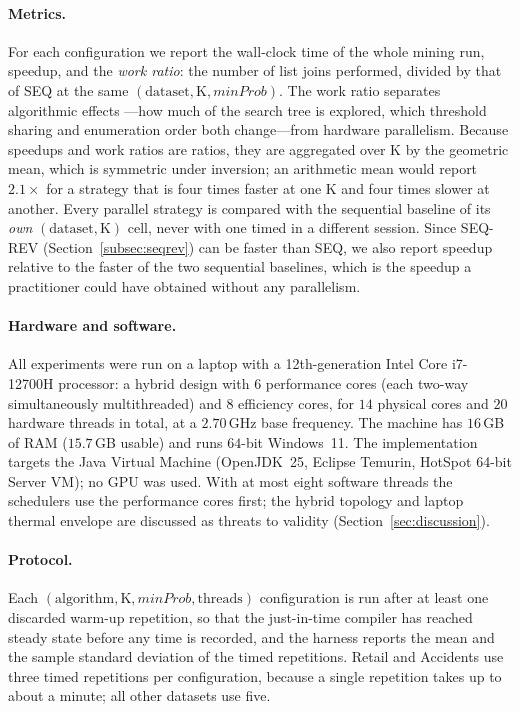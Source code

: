 \documentclass[pdflatex,sn-vancouver-num]{sn-jnl}
\theoremstyle{thmstyleone}%
\theoremstyle{thmstyletwo}%
\theoremstyle{thmstylethree}%
\newcommand{\minprob}{\mathit{minProb}}
\newcommand{\Kk}{\mathrm{K}}
\begin{document}
\paragraph{Metrics.}
For each configuration we report the wall-clock time of the whole mining
run, speedup, and the \emph{work ratio}: the number of
list joins performed, divided by that of SEQ at the same
$(\text{dataset},\Kk,\minprob)$. The work ratio separates algorithmic effects
---how much of the search tree is explored, which threshold sharing and
enumeration order both change---from hardware parallelism. Because
speedups and work ratios are ratios, they are aggregated over $\Kk$ by
the geometric mean, which is symmetric under inversion; an arithmetic mean
would report $2.1\times$ for a strategy that is four times faster at one
$\Kk$ and four times slower at another. Every parallel strategy is
compared with the sequential baseline of its \emph{own} $(\text{dataset},\Kk)$
cell, never with one timed in a different session.
Since SEQ-REV (Section~\ref{subsec:seqrev}) can be faster than SEQ, we
also report speedup relative to the faster of the two sequential
baselines, which is the speedup a practitioner could have obtained without
any parallelism.
 
\paragraph{Hardware and software.}
All experiments were run on a laptop with a 12th-generation Intel Core i7-12700H
processor: a hybrid design with $6$ performance cores (each two-way simultaneously
multithreaded) and $8$ efficiency cores, for $14$ physical cores and $20$ hardware
threads in total, at a $2.70$\,GHz base frequency. The machine has $16$\,GB of RAM
($15.7$\,GB usable) and runs $64$-bit Windows~11. The implementation targets the Java Virtual Machine (OpenJDK~25,
Eclipse Temurin, HotSpot 64-bit Server VM); no GPU was used. With at most eight
software threads the schedulers use the performance cores first; the hybrid
topology and laptop thermal envelope are discussed as threats to validity
(Section~\ref{sec:discussion}).
 
\paragraph{Protocol.}
Each $(\text{algorithm},\Kk,\minprob,\text{threads})$ configuration is run
after at least one discarded warm-up repetition, so that the just-in-time
compiler has reached steady state before any time is recorded, and the
harness reports the mean and the sample standard deviation of the timed
repetitions. Retail and Accidents use three timed repetitions per
configuration, because a single repetition takes up to about a minute;
all other datasets use five.
\end{document}
